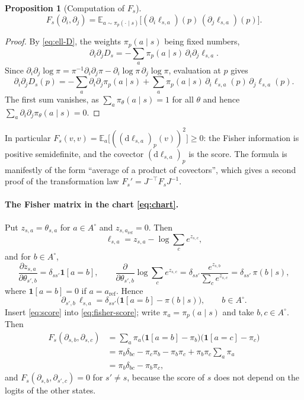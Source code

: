 \documentclass[11pt,a4paper]{article}
\numberwithin{equation}{section}
\theoremstyle{plain}
\newtheorem{proposition}[theorem]{Proposition}
\theoremstyle{definition}
\theoremstyle{remark}
\newcommand{\E}{\mathbb{E}}
\newcommand{\dd}{\mathrm{d}}
\newcommand{\aref}{a_{\mathrm{ref}}}
\newcommand{\Ao}{A^{\circ}}
\newcommand{\Ind}{\mathbf{1}}
\begin{document}
\begin{proposition}[Computation of $F_s$]\label{prop:fisher-score}
\begin{equation}\label{eq:fisher-score}
  F_s(\partial_i,\partial_j)=\E_{a\sim\pi_p(\cdot\mid s)}\bigl[(\partial_i\ell_{s,a})(p)\,(\partial_j\ell_{s,a})(p)\bigr].
\end{equation}
\end{proposition}

\begin{proof}
By \eqref{eq:ell-D}, the weights $\pi_p(a\mid s)$ being fixed numbers,
\[
  \partial_i\partial_jD_s=-\sum_a\pi_p(a\mid s)\,\partial_i\partial_j\ell_{s,a}.
\]
Since $\partial_i\partial_j\log\pi=\pi^{-1}\partial_i\partial_j\pi-\partial_i\log\pi\,\partial_j\log\pi$, evaluation at $p$ gives
\[
  \partial_i\partial_jD_s(p)=-\sum_a\partial_i\partial_j\pi_p(a\mid s)+\sum_a\pi_p(a\mid s)\,\partial_i\ell_{s,a}(p)\,\partial_j\ell_{s,a}(p).
\]
The first sum vanishes, as $\sum_a\pi_\theta(a\mid s)=1$ for all $\theta$ and hence $\sum_a\partial_i\partial_j\pi_\theta(a\mid s)=0$.
\end{proof}

In particular $F_s(v,v)=\E_a\bigl[((\dd\ell_{s,a})_p(v))^2\bigr]\ge0$: the Fisher information is positive semidefinite, and the covector $(\dd\ell_{s,a})_p$ is the score.
The formula is manifestly of the form ``average of a product of covectors'', which gives a second proof of the transformation law $F_s'=J^{-\top}F_sJ^{-1}$.

\paragraph{The Fisher matrix in the chart \eqref{eq:chart}.}
Put $z_{s,a}=\theta_{s,a}$ for $a\in\Ao$ and $z_{s,\aref}=0$. Then
\[
  \ell_{s,a}=z_{s,a}-\log\sum_ce^{z_{s,c}},
\]
and for $b\in\Ao$,
\[
  \frac{\partial z_{s,a}}{\partial\theta_{s',b}}=\delta_{ss'}\Ind[a=b],
  \qquad
  \frac{\partial}{\partial\theta_{s',b}}\log\sum_ce^{z_{s,c}}=\delta_{ss'}\frac{e^{z_{s,b}}}{\sum_ce^{z_{s,c}}}=\delta_{ss'}\,\pi(b\mid s),
\]
where $\Ind[a=b]=0$ if $a=\aref$. Hence
\begin{equation}\label{eq:score}
  \partial_{s',b}\,\ell_{s,a}=\delta_{ss'}\bigl(\Ind[a=b]-\pi(b\mid s)\bigr),\qquad b\in\Ao .
\end{equation}
Insert \eqref{eq:score} into \eqref{eq:fisher-score}; write $\pi_a=\pi_p(a\mid s)$ and take $b,c\in\Ao$. Then
\begin{align*}
  F_s(\partial_{s,b},\partial_{s,c})
  &=\sum_a\pi_a\bigl(\Ind[a=b]-\pi_b\bigr)\bigl(\Ind[a=c]-\pi_c\bigr)\\
  &=\pi_b\delta_{bc}-\pi_c\pi_b-\pi_b\pi_c+\pi_b\pi_c\sum_a\pi_a\\
  &=\pi_b\delta_{bc}-\pi_b\pi_c,
\end{align*}
and $F_s(\partial_{s,b},\partial_{s',c})=0$ for $s'\ne s$, because the score of $s$ does not depend on the logits of the other states.
\end{document}
